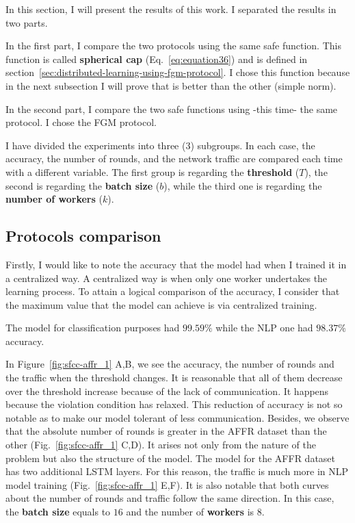 In this section, I will present the results of this work.
I separated the results in two parts.

In the first part, I compare the two protocols using the same safe function.
This function is called \textbf{spherical cap} (Eq.~\ref{eq:equation36}) and is defined in section~\ref{sec:distributed-learning-using-fgm-protocol}.
I chose this function because in the next subsection I will prove that is better than the other (simple norm).

In the second part, I compare the two safe functions using -this time- the same protocol.
I chose the FGM protocol.

I have divided the experiments into three (3) subgroups.
In each case, the accuracy, the number of rounds, and the network traffic are compared each time with a different variable.
The first group is regarding the \textbf{threshold} ($T$), the second is regarding the \textbf{batch size} ($b$),
while the third one is regarding the \textbf{number of workers} ($k$).

\subsection{Protocols comparison}\label{subsec:protocols-comparison}

Firstly, I would like to note the accuracy that the model had when I trained it in a centralized way.
A centralized way is when only one worker undertakes the learning process.
To attain a logical comparison of the accuracy, I consider that the maximum value that the model can achieve is via centralized training.

The model for classification purposes had $99.59\%$ while the  NLP one had $98.37\%$ accuracy.

In Figure~\ref{fig:sfcc-affr_1} A,B, we see the accuracy, the number of rounds and the traffic when the threshold changes.
It is reasonable that all of them decrease over the threshold increase because of the lack of communication.
It happens because the violation condition has relaxed.
This reduction of accuracy is not so notable as to make our model tolerant of less communication.
Besides, we observe that the absolute number of rounds is greater in the AFFR dataset than the other (Fig.~\ref{fig:sfcc-affr_1} C,D).
It arises not only from the nature of the problem but also the structure of the model.
The model for the AFFR dataset has two additional LSTM layers.
For this reason, the traffic is much more in NLP model training (Fig.~\ref{fig:sfcc-affr_1} E,F).
It is also notable that both curves about the number of rounds and traffic follow the same direction.
In this case, the \textbf{batch size} equals to $16$ and the number of \textbf{workers} is $8$.

